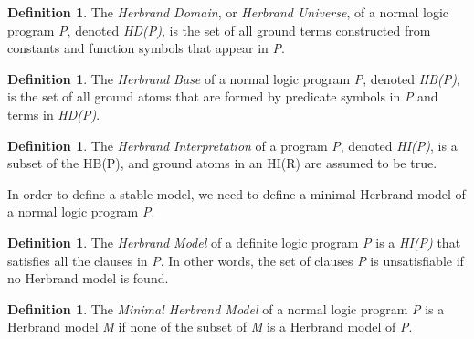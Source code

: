 \documentclass[11pt,twoside]{report}
\theoremstyle{plain}
\theoremstyle{definition}
\newtheorem{defn}[thm]{Definition} %
\begin{document}
\begin{defn}
\label{def:herbrand_domain}
The \textit{Herbrand Domain}, or \textit{Herbrand Universe}, of a normal logic program \textit{P}, denoted \textit{HD(P)}, is the set of all ground terms constructed from constants and function symbols that appear in \textit{P}.
\end{defn}

\begin{defn}
\label{def:herbrand_base}
The \textit{Herbrand Base} of a normal logic program \textit{P}, denoted \textit{HB(P)}, is the set of all ground atoms that are formed by predicate symbols in \textit{P} and terms in \textit{HD(P)}.
\end{defn}

\begin{defn}
The \textit{Herbrand Interpretation} of a program \textit{P}, denoted \textit{HI(P)}, is a subset of the HB(P), and ground atoms in an HI(R) are assumed to be true.
\end{defn}

In order to define a stable model, we need to define a minimal Herbrand model of a normal logic program \textit{P}.

\begin{defn}
\label{def:herbrand_model}
The \textit{Herbrand Model} of a definite logic program \textit{P} is a \textit{HI(P)} that satisfies all the clauses in \textit{P}. In other words, the set of clauses \textit{P} is unsatisfiable if no Herbrand model is found.
\end{defn}

\begin{defn}
\label{def:minimal_herbrand_model}
The \textit{Minimal Herbrand Model} of a normal logic program \textit{P} is a Herbrand model \textit{M} if none of the subset of \textit{M} is a Herbrand model of \textit{P}.
\end{defn}


\end{document}
